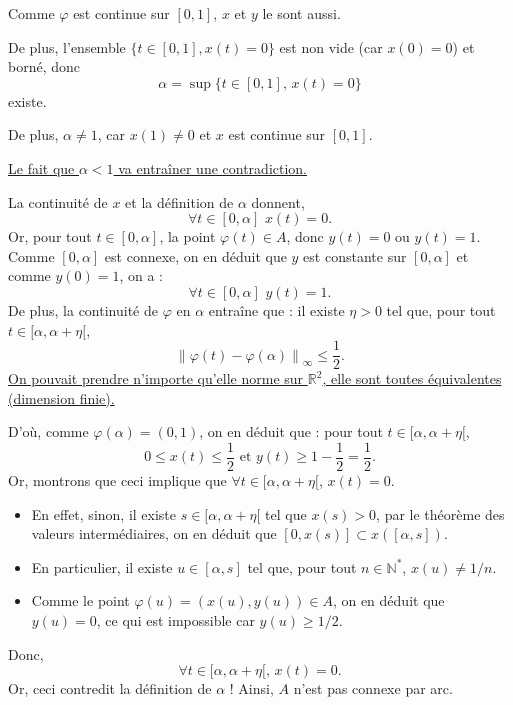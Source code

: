 \begin{myproof}{}{}
\begin{enumerate}
Comme $\varphi$ est continue sur $[0,1]$, $x$ et $y$ le sont aussi.

De plus, l'ensemble $\{t\in[0,1],x(t)=0\}$ est non vide (car $x(0)=0$) et borné, donc 
$$\alpha = \sup\{t\in[0,1],\, x(t)=0\}$$
existe.

De plus, $\alpha\neq 1$, car $x(1)\neq 0$ et $x$ est continue sur $[0,1]$.

\underline{Le fait que $\alpha<1$ va entraîner une contradiction.}

La continuité de $x$ et la définition de $\alpha$ donnent,
$$\forall t\in[0,\alpha]\, \, x(t)=0.$$
Or, pour tout $t\in[0,\alpha]$, la point $\varphi(t) \in A$, donc $y(t)=0$ ou $y(t)=1$.
Comme $[0,\alpha]$ est connexe, on en déduit que $y$ est constante sur $[0,\alpha]$ et comme $y(0)=1$, on a :
$$\forall t\in[0,\alpha]\, \, y(t)=1.$$
De plus, la continuité de $\varphi$ en $\alpha$ entraîne que : il existe $\eta>0$ tel que, pour tout $t\in[\alpha, \alpha+\eta[$,
$$\left\|\varphi(t) - \varphi(\alpha)\right\|_{\infty} \leq \frac{1}{2}.$$
\underline{On pouvait prendre n'importe qu'elle norme sur $\mathbb{R}^2$, elle sont toutes équivalentes (dimension finie).}

D'où, comme  $\varphi(\alpha) = (0,1)$, on en déduit que : pour tout $t\in[\alpha, \alpha+\eta[$,
$$0\leq x(t) \leq  \frac{1}{2} \,\,\text{et}\,\, y(t) \geq 1-\frac{1}{2}=\frac{1}{2}.$$
Or, montrons que ceci implique que $\forall t \in [\alpha, \alpha+\eta[$, $x(t)=0$.
\begin{itemize}

    \item En effet, sinon, il existe $s\in [\alpha, \alpha+\eta[$ tel que $x(s) >0$, par le théorème des valeurs intermédiaires, on en déduit que $[0,x(s)]\subset x([\alpha, s])$.
    \item En particulier, il existe $u \in [\alpha, s]$ tel que, pour tout $n\in\mathbb{N}^*$, $x(u)\neq 1/n$. 
    \item Comme le point $\varphi(u) =(x(u),y(u)) \in A$, on en déduit que $y(u)=0$, ce qui est impossible car $y(u) \geq 1/2$.

\end{itemize}
    
Donc,
$$\forall t \in [\alpha, \alpha+\eta[, \,x(t)=0.$$
Or, ceci contredit la définition de $\alpha$ !
Ainsi, $A$ n'est pas connexe par arc.

\end{enumerate}
\end{myproof}




